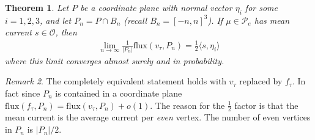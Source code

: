 \documentclass[11pt]{article}
\newtheorem{thm}{Theorem}[subsection]
\theoremstyle{remark}
\newtheorem{rem}[thm]{Remark}
\theoremstyle{definition}
\newcommand{\mc}[1]{\mathcal{#1}}
\begin{document}
\begin{thm}\label{thm: subaction ergodic}
    Let $P$ be a coordinate plane with normal vector $\eta_i$ for some $i=1,2,3$, and let $P_n = P\cap B_n$ (recall $B_n=[-n,n]^3$). If $\mu\in \mc P_e$ has mean current $s\in \mc O$, then 
    \begin{align*}
        \lim_{n\to \infty} \frac{1}{|P_n|} \text{flux}(v_\tau,P_n) = \frac{1}{2}\langle s,\eta_i\rangle 
    \end{align*}
    where this limit converges almost surely and in probability.
\end{thm}
\begin{rem}
    The completely equivalent statement holds with $v_\tau$ replaced by $f_\tau$. In fact since $P_n$ is contained in a coordinate plane 
$\text{flux}(f_\tau,P_n) = \text{flux}(v_\tau,P_n)+o(1)$. The reason for the $\frac{1}{2}$ factor is that the mean current is the average current per \textit{even} vertex. The number of even vertices in $P_n$ is $|P_n|/2$.
\end{rem}
\end{document}
